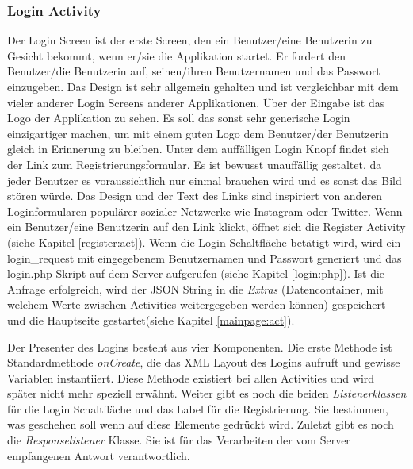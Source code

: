 \documentclass[a4paper,11pt]{report}
\begin{document}
				\subsubsection{Login Activity} \label{login:act}
				Der Login Screen ist der erste Screen, den ein Benutzer/eine Benutzerin zu Gesicht bekommt, wenn er/sie die Applikation startet. Er fordert den Benutzer/die Benutzerin auf, seinen/ihren Benutzernamen und das Passwort einzugeben. Das Design ist sehr allgemein gehalten und ist vergleichbar mit dem vieler anderer Login Screens anderer Applikationen. Über der Eingabe ist das Logo der Applikation zu sehen. Es soll das sonst sehr generische Login einzigartiger machen, um mit einem guten Logo dem Benutzer/der Benutzerin gleich in Erinnerung zu bleiben. Unter dem auffälligen Login Knopf findet sich der Link zum Registrierungsformular. Es ist bewusst unauffällig gestaltet, da jeder Benutzer es voraussichtlich nur einmal brauchen wird und es sonst das Bild stören würde. Das Design und der Text des Links sind inspiriert von anderen Loginformularen populärer sozialer Netzwerke wie Instagram oder Twitter. Wenn ein Benutzer/eine Benutzerin auf den Link klickt, öffnet sich die Register Activity (siehe Kapitel \ref{register:act}). Wenn die Login Schaltfläche betätigt wird, wird ein login\_request mit eingegebenem Benutzernamen und Passwort generiert und das login.php Skript auf dem Server aufgerufen (siehe Kapitel \ref{login:php}). Ist die Anfrage erfolgreich, wird der JSON String in die \emph{Extras} (Datencontainer, mit welchem Werte zwischen Activities weitergegeben werden können) gespeichert und die Hauptseite gestartet(siehe Kapitel \ref{mainpage:act}).
				
				Der Presenter des Logins besteht aus vier Komponenten. Die erste Methode ist Standardmethode \emph{onCreate}, die das XML Layout des Logins aufruft und gewisse Variablen instantiiert. Diese Methode existiert bei allen Activities und wird später nicht mehr speziell erwähnt. Weiter gibt es noch die beiden \emph{Listenerklassen} für die Login Schaltfläche und das Label für die Registrierung. Sie bestimmen, was geschehen soll wenn auf diese Elemente gedrückt wird. Zuletzt gibt es noch die \emph{Responselistener} Klasse. Sie ist für das Verarbeiten der vom Server empfangenen Antwort verantwortlich. 
				
\end{document}
